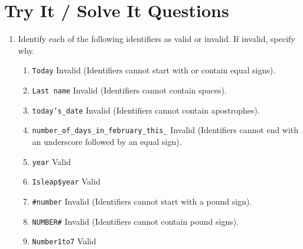 \documentclass[11pt]{article}
\begin{document}
\section{Try It / Solve It Questions}
\label{sec:orge504f3a}
\begin{enumerate}
\item Identify each of the following identifiers as valid or invalid. If invalid,
specify why.
\begin{enumerate}
\item \texttt{Today}
Invalid (Identifiers cannot start with or contain equal signs).
\item \texttt{Last name}
Invalid (Identifiers cannot contain spaces).
\item \texttt{today’s\_date}
Invalid (Identifiers cannot contain apostrophes).
\item \texttt{number\_of\_days\_in\_february\_this\_}
Invalid (Identifiers cannot end with an underscore followed by an equal sign).
\item \texttt{year}
Valid
\item \texttt{Isleap\$year}
Valid
\item \texttt{\#number}
Invalid (Identifiers cannot start with a pound sign).
\item \texttt{NUMBER\#}
Invalid (Identifiers cannot contain pound signs).
\item \texttt{Number1to7}
Valid
\end{enumerate}


\end{enumerate}
\end{document}
